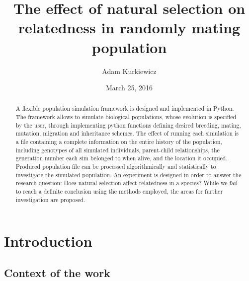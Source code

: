 \documentclass{l4proj}
\newif\ifdebug
\begin{document}
\title{The effect of natural selection on relatedness in randomly mating population}
\author{Adam Kurkiewicz}
\date{March 25, 2016}
\maketitle


\begin{abstract}

A flexible population simulation framework is designed and implemented in Python. The framework allows to simulate biological populations, whose evolution is specified by the user, through implementing python functions defining desired breeding, mating, mutation, migration and inheritance schemes. The effect of running each simulation is a file containing a complete information on the entire history of the population, including genotypes of all simulated individuals, parent-child relationships, the generation number each sim belonged to when alive, and the location it occupied. Produced population file can be processed algorithmically and statistically to investigate the simulated population. An experiment is designed in order to answer the research question: Does natural selection affect relatedness in a species? While we fail to reach a definite conclusion using the methods employed, the areas for further investigation are proposed.

\end{abstract}

\educationalconsent

\tableofcontents


\chapter{Introduction}
\label{intro}

\ifdebug
  Introduction. This should place the work in context and will be developed from the introduction produced for assessment.
\fi


\section{Context of the work}
\end{document}
